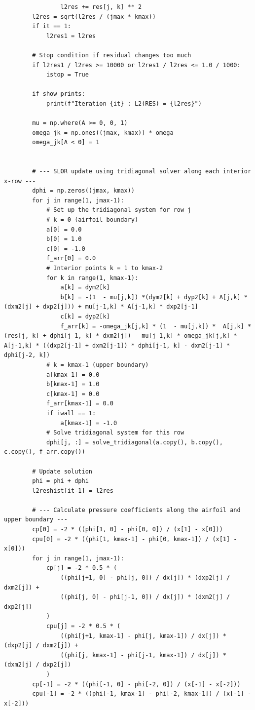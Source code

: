 \documentclass[12pt]{article}
\theoremstyle{definition}
\begin{document}
\begin{verbatim}
                l2res += res[j, k] ** 2
        l2res = sqrt(l2res / (jmax * kmax))
        if it == 1:
            l2res1 = l2res
        
        # Stop condition if residual changes too much
        if l2res1 / l2res >= 10000 or l2res1 / l2res <= 1.0 / 1000:
            istop = True
        
        if show_prints:
            print(f"Iteration {it} : L2(RES) = {l2res}")
        
        mu = np.where(A >= 0, 0, 1)
        omega_jk = np.ones((jmax, kmax)) * omega
        omega_jk[A < 0] = 1
        
        
        # --- SLOR update using tridiagonal solver along each interior x-row ---
        dphi = np.zeros((jmax, kmax))
        for j in range(1, jmax-1):
            # Set up the tridiagonal system for row j
            # k = 0 (airfoil boundary)
            a[0] = 0.0
            b[0] = 1.0
            c[0] = -1.0
            f_arr[0] = 0.0
            # Interior points k = 1 to kmax-2
            for k in range(1, kmax-1):
                a[k] = dym2[k]
                b[k] = -(1  - mu[j,k]) *(dym2[k] + dyp2[k] + A[j,k] * (dxm2[j] + dxp2[j])) + mu[j-1,k] * A[j-1,k] * dxp2[j-1]
                c[k] = dyp2[k]
                f_arr[k] = -omega_jk[j,k] * (1  - mu[j,k]) *  A[j,k] * (res[j, k] + dphi[j-1, k] * dxm2[j]) - mu[j-1,k] * omega_jk[j,k] * A[j-1,k] * ((dxp2[j-1] + dxm2[j-1]) * dphi[j-1, k] - dxm2[j-1] * dphi[j-2, k])
            # k = kmax-1 (upper boundary)
            a[kmax-1] = 0.0
            b[kmax-1] = 1.0
            c[kmax-1] = 0.0
            f_arr[kmax-1] = 0.0
            if iwall == 1:
                a[kmax-1] = -1.0
            # Solve tridiagonal system for this row
            dphi[j, :] = solve_tridiagonal(a.copy(), b.copy(), c.copy(), f_arr.copy())
        
        # Update solution
        phi = phi + dphi
        l2reshist[it-1] = l2res

        # --- Calculate pressure coefficients along the airfoil and upper boundary ---
        cp[0] = -2 * ((phi[1, 0] - phi[0, 0]) / (x[1] - x[0]))
        cpu[0] = -2 * ((phi[1, kmax-1] - phi[0, kmax-1]) / (x[1] - x[0]))
        for j in range(1, jmax-1):
            cp[j] = -2 * 0.5 * (
                ((phi[j+1, 0] - phi[j, 0]) / dx[j]) * (dxp2[j] / dxm2[j]) +
                ((phi[j, 0] - phi[j-1, 0]) / dx[j]) * (dxm2[j] / dxp2[j])
            )
            cpu[j] = -2 * 0.5 * (
                ((phi[j+1, kmax-1] - phi[j, kmax-1]) / dx[j]) * (dxp2[j] / dxm2[j]) +
                ((phi[j, kmax-1] - phi[j-1, kmax-1]) / dx[j]) * (dxm2[j] / dxp2[j])
            )
        cp[-1] = -2 * ((phi[-1, 0] - phi[-2, 0]) / (x[-1] - x[-2]))
        cpu[-1] = -2 * ((phi[-1, kmax-1] - phi[-2, kmax-1]) / (x[-1] - x[-2]))
        

\end{verbatim}
\end{document}
